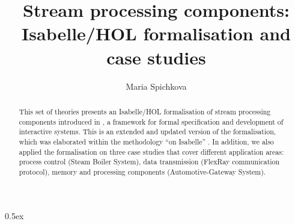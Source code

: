 \documentclass[11pt,a4paper]{article}
\begin{document}


\title{Stream processing components:\\ Isabelle/HOL formalisation and case studies}
\author{Maria Spichkova}
\maketitle


\begin{abstract}
This set of theories presents an Isabelle/HOL formalisation of stream processing components introduced in
  \Focus,
a framework for formal specification and development of interactive systems.
This is an extended and updated version of the formalisation, which was
elaborated within the methodology ``\Focus on Isabelle'' \cite{spichkova}.
In addition, we also applied the formalisation on three case studies
that cover different application areas:
process control (Steam Boiler System),
data transmission (FlexRay communication protocol),
memory and processing components (Automotive-Gateway System).
\end{abstract}
\tableofcontents

\newpage



\parindent 0pt\parskip 0.5ex

\newpage




\end{document}
